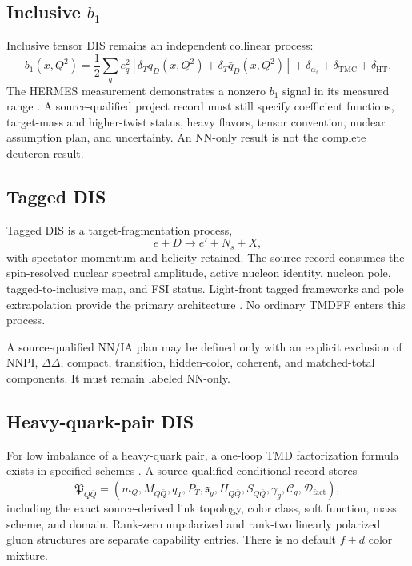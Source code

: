 \documentclass[11pt]{article}
\newcommand{\as}{\alpha_s}
\begin{document}
\subsection{Inclusive \texorpdfstring{\(b_1\)}{b1}}

Inclusive tensor DIS remains an independent collinear process:
\begin{equation}
 b_1(x,Q^2)
 =
 \frac12\sum_q e_q^2
 \left[\delta_Tq_D(x,Q^2)+\delta_T\bar q_D(x,Q^2)\right]
 +\delta_{\as}+\delta_{\mathrm{TMC}}+\delta_{\mathrm{HT}}.
 \label{eq:source-b1}
\end{equation}
The HERMES measurement demonstrates a nonzero \(b_1\) signal in its measured range \cite{HERMES2005}.  A source-qualified project record must still specify coefficient functions, target-mass and higher-twist status, heavy flavors, tensor convention, nuclear assumption plan, and uncertainty.  An NN-only result is not the complete deuteron result.

\subsection{Tagged DIS}

Tagged DIS is a target-fragmentation process,
\begin{equation}
 e+D\longrightarrow e'+N_s+X,
 \label{eq:tagged-process}
\end{equation}
with spectator momentum and helicity retained.  The source record consumes the spin-resolved nuclear spectral amplitude, active nucleon identity, nucleon pole, tagged-to-inclusive map, and FSI status.  Light-front tagged frameworks and pole extrapolation provide the primary architecture \cite{Cosyn2020,Strikman2017,Cosyn2026}.  No ordinary TMDFF enters this process.

A source-qualified NN/IA plan may be defined only with an explicit exclusion of NNPI, \(\Delta\Delta\), compact, transition, hidden-color, coherent, and matched-total components.  It must remain labeled NN-only.

\subsection{Heavy-quark-pair DIS}

For low imbalance of a heavy-quark pair, a one-loop TMD factorization formula exists in specified schemes \cite{Zhu2013}.  A source-qualified conditional record stores
\begin{equation}
 \mathfrak P_{Q\bar Q}
 =
 \left(
 m_Q, M_{Q\bar Q}, q_T, P_T,
 \mathfrak s_g,
 H_{Q\bar Q},
 S_{Q\bar Q},
 \gamma_g,
 \mathcal C_g,
 \mathcal D_{\mathrm{fact}}
 \right),
 \label{eq:heavy-pair-record}
\end{equation}
including the exact source-derived link topology, color class, soft function, mass scheme, and domain.  Rank-zero unpolarized and rank-two linearly polarized gluon structures are separate capability entries.  There is no default \(f+d\) color mixture.
\end{document}
